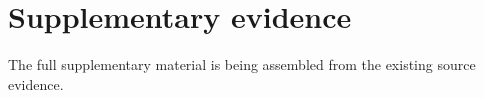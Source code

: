 \section{Supplementary evidence}
The full supplementary material is being assembled from the existing source evidence.
